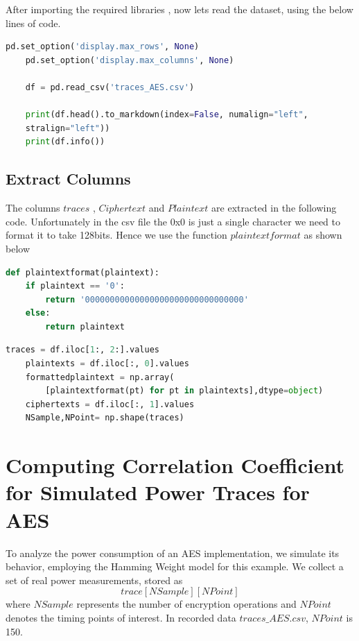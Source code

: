 \documentclass[12pt, letterpaper, oneside]{report}
\begin{document}
After importing the required libraries , now lets read the dataset, using the below lines of code.\\


\begin{lstlisting}[language=Python, caption=Reading the dataset]
    pd.set_option('display.max_rows', None)
    pd.set_option('display.max_columns', None)
    
    df = pd.read_csv('traces_AES.csv')
    
    print(df.head().to_markdown(index=False, numalign="left",
    stralign="left"))
    print(df.info())
\end{lstlisting}

\section{Extract Columns}

The columns $traces$ , $Ciphertext$ and $Plaintext$ are extracted in the following code. Unfortunately in the csv file the 0x0 is just a single character we need to format it to take 128bits. Hence we use the function $plaintextformat$ as shown below \\


\begin{lstlisting}[language=Python, caption=Normalising the data]
    def plaintextformat(plaintext):
    if plaintext == '0':
        return '00000000000000000000000000000000'
    else:
        return plaintext
\end{lstlisting} 


\begin{lstlisting}[language=Python, caption=Extracting Columns]
    traces = df.iloc[1:, 2:].values
    plaintexts = df.iloc[:, 0].values
    formattedplaintext = np.array(
        [plaintextformat(pt) for pt in plaintexts],dtype=object)
    ciphertexts = df.iloc[:, 1].values
    NSample,NPoint= np.shape(traces)
\end{lstlisting} 

\chapter{Computing Correlation Coeﬃcient for Simulated Power Traces for AES}

To analyze the power consumption of an AES implementation, we simulate its behavior, employing the Hamming Weight model for this example. We collect a set of real power measurements, stored as $$trace[NSample][NPoint]$$ where $NSample$ represents the number of encryption operations and $NPoint$ denotes the timing points of interest. In recorded data $traces\_AES.csv$, $NPoint$ is 150.\\
\end{document}
